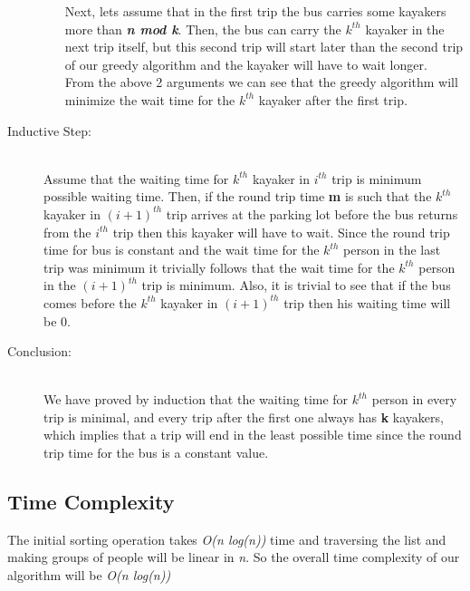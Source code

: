 \documentclass[8pt]{article}
\begin{document}
\begin{description}
\begin{enumerate}
            Next, lets assume that in the first trip the bus carries some kayakers more than \textbf{\textit{n mod k}}. Then, the bus can carry the \textbf{\textit{$k^{th}$}} kayaker in the next trip itself, but this second trip will start later than the second trip of our greedy algorithm and the kayaker will have to wait longer. \\

            From the above 2 arguments we can see that the greedy algorithm will minimize the wait time for the \textbf{\textit{$k^{th}$}} kayaker after the first trip. \\
    \end{enumerate}
    \item[Inductive Step: ] \hfill \\
        Assume that the waiting time for \textbf{\textit{$k^{th}$}} kayaker in \textbf{\textit{$i^{th}$}} trip is minimum possible waiting time. Then, if the round trip time \textbf{m} is such that the \textbf{\textit{$k^{th}$}} kayaker in \textbf{\textit{$(i+1)^{th}$}} trip arrives at the parking lot before the bus returns from the \textbf{\textit{$i^{th}$}} trip then this kayaker will have to wait. Since the round trip time for bus is constant and the wait time for the \textbf{\textit{$k^{th}$}} person in the last trip was minimum it trivially follows that the wait time for the \textbf{\textit{$k^{th}$}} person in the \textbf{\textit{$(i+1)^{th}$}} trip is minimum. Also, it is trivial to see that if the bus comes before the \textbf{\textit{$k^{th}$}} kayaker in \textbf{\textit{$(i+1)^{th}$}} trip then his waiting time will be 0. \\
    \item[Conclusion: ] \hfill \\
        We have proved by induction that the waiting time for \textbf{\textit{$k^{th}$}} person in every trip is minimal, and every trip after the first one always has \textbf{k} kayakers, which implies that a trip will end in the least possible time since the round trip time for the bus is a constant value.
\end{description}

\subsection{Time Complexity}
The initial sorting operation takes \textit{O(n log(n))} time and traversing the list and making groups of people will be linear in \textit{n}. So the overall time complexity of our algorithm will be \textit{O(n log(n))}
\end{document}
